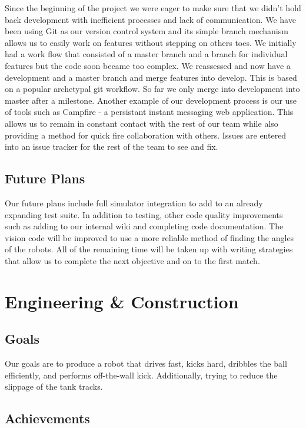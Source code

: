 \documentclass[12pt, a4paper, titlepage]{article}
\begin{document}
Since the beginning of the project we were eager to make sure that we didn't
hold back development with inefficient processes and lack of communication.
We have been using Git\cite{git-scm} as our version control system and its
simple branch mechanism allows us to easily work on features without stepping
on others toes. We initially had a work flow that consisted of a master branch
and a branch for individual features but the code soon became too complex. We
reassessed and now have a development and a master branch and merge features
into develop. This is based on a popular archetypal git workflow. So far we
only merge into development into master after a milestone. Another example of
our development process is our use of tools such as Campfire\cite{campfire} -
a persistant instant messaging web application. This allows us to remain in
constant contact with the rest of our team while also providing a method for
quick fire collaboration with others. Issues are entered into an issue tracker
for the rest of the team to see and fix.

\subsection{Future Plans}

Our future plans include full simulator integration to add to an already
expanding test suite. In addition to testing, other code quality improvements
such as adding to our internal wiki and completing code documentation. The
vision code will be improved to use a more reliable method of finding the
angles of the robots. All of the remaining time will be taken up with writing
strategies that allow us to complete the next objective and on to the first
match.

\section{Engineering \& Construction}

\subsection{Goals}

Our goals are to produce a robot that drives fast, kicks hard, dribbles the ball
efficiently, and performs off-the-wall kick. Additionally, trying to reduce the
slippage of the tank tracks.

\subsection{Achievements}
\end{document}
